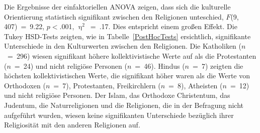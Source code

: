 Die Ergebnisse der einfaktoriellen ANOVA zeigen, dass sich die kulturelle Orientierung statistisch signifikant zwischen den Religionen unteschied, $F$(9, 407)~=~9.22, $p<$.001, $\upeta^{2}$~=~.17. Dies entspricht einem großen Effekt. 
Die Tukey HSD-Tests zeigten, wie in Tabelle~\ref{PostHocTests} ersichtlich, signifikante Unterschiede in den Kulturwerten zwischen den Religionen. Die Katholiken ($n$~=~296) wiesen signifikant höhere kollektivistische Werte auf als die Protestanten ($n$~=~24) und nicht religiöse Personen ($n$~=~46). Hindus ($n$~=~7) zeigten die höchsten kollektivistischen Werte, die signifikant höher waren als die Werte von Orthodoxen ($n$~=~7), Protestanten, Freikirchlern ($n$~=~8), Atheisten ($n$~=~12) und nicht religiöse Personen. Der Islam, das Orthodoxe Christentum, das Judentum, die Naturreligionen und die Religionen, die in der Befragung nicht aufgeführt wurden, wiesen keine signifikanten Unterschiede bezüglich ihrer Religiosität mit den anderen Religionen auf.



